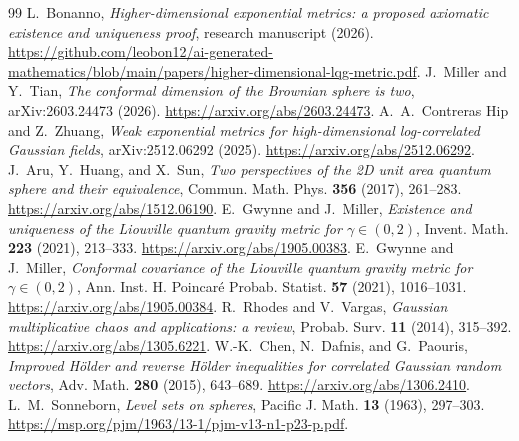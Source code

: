 \documentclass[11pt,reqno]{amsart}
\theoremstyle{plain}
\theoremstyle{definition}
\theoremstyle{remark}
\newcommand{\1}{\mathbf{1}}
\begin{document}
\begin{thebibliography}{99}
 L.~Bonanno, \emph{Higher-dimensional exponential metrics: a proposed axiomatic existence and uniqueness proof}, research manuscript (2026). \url{https://github.com/leobon12/ai-generated-mathematics/blob/main/papers/higher-dimensional-lqg-metric.pdf}.
 J.~Miller and Y.~Tian, \emph{The conformal dimension of the Brownian sphere is two}, arXiv:2603.24473 (2026). \url{https://arxiv.org/abs/2603.24473}.
 A.~A.~Contreras Hip and Z.~Zhuang, \emph{Weak exponential metrics for high-dimensional log-correlated Gaussian fields}, arXiv:2512.06292 (2025). \url{https://arxiv.org/abs/2512.06292}.
 J.~Aru, Y.~Huang, and X.~Sun, \emph{Two perspectives of the 2D unit area quantum sphere and their equivalence}, Commun. Math. Phys. \textbf{356} (2017), 261--283. \url{https://arxiv.org/abs/1512.06190}.
 E.~Gwynne and J.~Miller, \emph{Existence and uniqueness of the Liouville quantum gravity metric for $\gamma\in(0,2)$}, Invent. Math. \textbf{223} (2021), 213--333. \url{https://arxiv.org/abs/1905.00383}.
 E.~Gwynne and J.~Miller, \emph{Conformal covariance of the Liouville quantum gravity metric for $\gamma\in(0,2)$}, Ann. Inst. H. Poincar\'e Probab. Statist. \textbf{57} (2021), 1016--1031. \url{https://arxiv.org/abs/1905.00384}.
 R.~Rhodes and V.~Vargas, \emph{Gaussian multiplicative chaos and applications: a review}, Probab. Surv. \textbf{11} (2014), 315--392. \url{https://arxiv.org/abs/1305.6221}.
 W.-K.~Chen, N.~Dafnis, and G.~Paouris, \emph{Improved H\"older and reverse H\"older inequalities for correlated Gaussian random vectors}, Adv. Math. \textbf{280} (2015), 643--689. \url{https://arxiv.org/abs/1306.2410}.
 L.~M.~Sonneborn, \emph{Level sets on spheres}, Pacific J. Math. \textbf{13} (1963), 297--303. \url{https://msp.org/pjm/1963/13-1/pjm-v13-n1-p23-p.pdf}.
\end{thebibliography}
\end{document}
